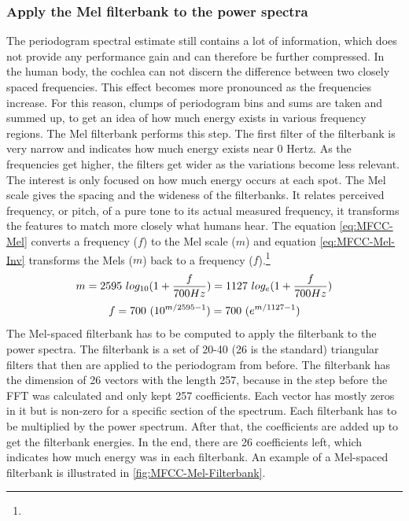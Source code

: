 \subsubsection{Apply the Mel filterbank to the power spectra}
The periodogram spectral estimate still contains a lot of information, which does not provide any performance gain and can therefore be further compressed. In the human body, the cochlea can not discern the difference between two closely spaced frequencies. This effect becomes more pronounced as the frequencies increase. For this reason, clumps of periodogram bins and sums are taken and summed up, to get an idea of how much energy exists in various frequency regions.
\newline
\newline
The Mel filterbank performs this step. The first filter of the filterbank is very narrow and indicates how much energy exists near 0 Hertz. As the frequencies get higher, the filters get wider as the variations become less relevant. The interest is only focused on how much energy occurs at each spot. The Mel scale gives the spacing and the wideness of the filterbanks. It relates perceived frequency, or pitch, of a pure tone to its actual measured frequency, it transforms the features to match more closely what humans hear. The equation \ref{eq:MFCC-Mel} converts a frequency ($f$) to the Mel scale ($m$) and equation \ref{eq:MFCC-Mel-Inv} transforms the Mels ($m$) back to a frequency ($f$).\footnote{}
\begin{equation}
    \centering
    m = 2595 \ log_{10}(1 + \frac{f}{700Hz}) = 1127 \ log_e(1 + \frac{f}{700Hz})
    \label{eq:MFCC-Mel}
\end{equation}
\begin{equation}
    \centering
    f = 700 \ (10^{m/2595-1}) = 700 \ (e^{m/1127-1})
    \label{eq:MFCC-Mel-Inv}
\end{equation}
The Mel-spaced filterbank has to be computed to apply the filterbank to the power spectra. The filterbank is a set of 20-40 (26 is the standard) triangular filters that then are applied to the periodogram from before. The filterbank has the dimension of 26 vectors with the length 257, because in the step before the \gls{FFT} was calculated and only kept 257 coefficients. Each vector has mostly zeros in it but is non-zero for a specific section of the spectrum. Each filterbank has to be multiplied by the power spectrum. After that, the coefficients are added up to get the filterbank energies. In the end, there are 26 coefficients left, which indicates how much energy was in each filterbank. An example of a Mel-spaced filterbank is illustrated in \ref{fig:MFCC-Mel-Filterbank}.
